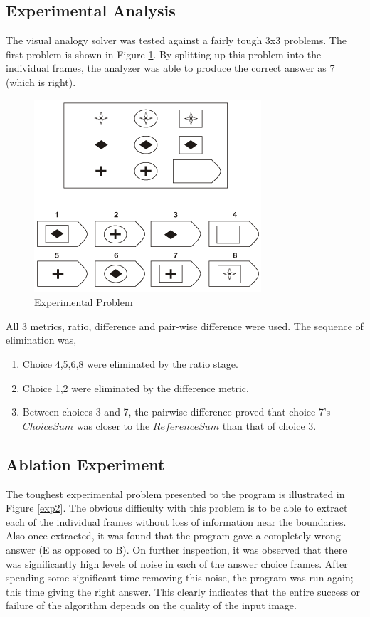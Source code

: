 \documentclass[10pt, letter]{article}
\begin{document}
\subsection*{Experimental Analysis}
The visual analogy solver was tested against a fairly tough 3x3 problems. The first problem is shown in Figure \ref{exp1}. By splitting up this problem into the individual frames, the analyzer was able to produce the correct answer as 7 (which is right). 
\begin{figure}[h!]
  \centering
    \includegraphics[scale = 0.45]{Images/Exp1}
    \caption{Experimental Problem}
  \label{exp1}
\end{figure}

All 3 metrics, ratio, difference and pair-wise difference were used. The sequence of elimination was,
\begin{enumerate}
	\item Choice 4,5,6,8 were eliminated by the ratio stage.
	\item Choice 1,2 were eliminated by the difference metric.
	\item Between choices 3 and 7, the pairwise difference proved that choice 7's $ChoiceSum$ was closer to the $ReferenceSum$ than that of choice 3.	
\end{enumerate}

\subsection*{Ablation Experiment}
The toughest experimental problem presented to the program is illustrated in Figure \ref{exp2}. The obvious difficulty with this problem is to be able to extract each of the individual frames without loss of information near the boundaries. Also once extracted, it was found that the program gave a completely wrong answer (E as opposed to B). On further inspection, it was observed that there was significantly high levels of noise in each of the answer choice frames. After spending some significant time removing this noise, the program was run again; this time giving the right answer. This clearly indicates that the entire success or failure of the algorithm depends on the quality of the input image.
\end{document}
